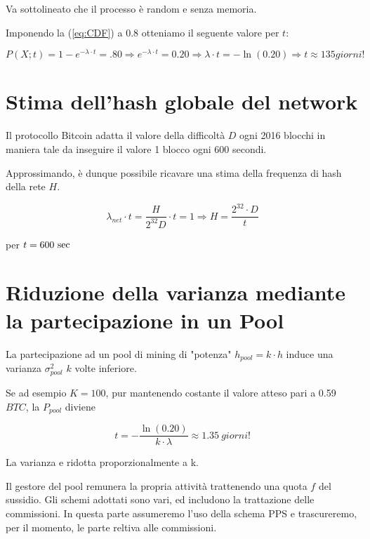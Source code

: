 \documentclass{article}
\begin{document}
Va sottolineato che il processo è random e senza memoria.

Imponendo la (\ref{eq:CDF}) a 0.8 otteniamo il seguente valore per $t$:

\begin{equation}
    P(X; t) = 1 - e^{-\lambda \cdot t} = .80 \Rightarrow  e^{-\lambda \cdot t} = 0.20 \Rightarrow  {\lambda \cdot t} = -\ln(0.20) \Rightarrow t \approx 135 \textit{giorni!} 
\end{equation}

\section{Stima dell'hash globale del network}

Il protocollo Bitcoin adatta il valore della difficoltà $D$ ogni 2016 blocchi in maniera tale da inseguire il valore 1 blocco ogni 600 secondi.

Approssimando, è dunque possibile ricavare una stima della frequenza di hash della rete $H$.

\begin{equation}
    \lambda_{net} \cdot t = \frac{H}{2^{32}D} \cdot t = 1 \Rightarrow H = \frac{2^{32} \cdot D}{t} \label{lamda_net}
\end{equation}

per $t = 600 \ \textnormal{sec}$

\section{Riduzione della varianza mediante la partecipazione in un Pool}

La partecipazione ad un pool di mining di "potenza" $h_{\textit{pool}} = k \cdot h$ induce una varianza $\sigma_{\textit{pool}}^{2}$ $k$ volte inferiore.

Se ad esempio $K = 100$, pur mantenendo costante il valore atteso pari a 0.59 $BTC$, la $P_{pool}$ diviene

\begin{equation}
    t = -\frac{\ln(0.20)}{k \cdot \lambda} \approx 1.35 \ \textit{giorni!} 
\end{equation}

La varianza e ridotta proporzionalmente a k.

Il gestore del pool remunera la propria attività trattenendo una quota $f$ del sussidio. Gli schemi adottati sono vari, ed includono la trattazione delle commissioni. 
In questa parte assumeremo l'uso della schema PPS e trascureremo, per il momento, le parte reltiva alle commissioni.
\end{document}

